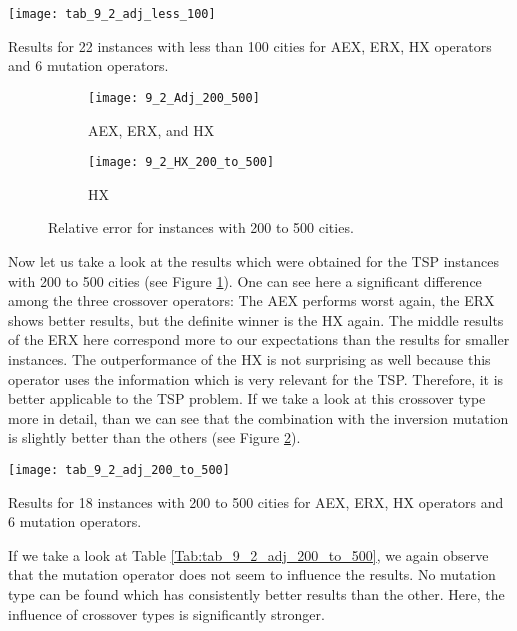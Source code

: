  \begin{table}[htp] \centering
	\centering
	\texttt{[image: tab\_9\_2\_adj\_less\_100]}
	\caption{Results for 22 instances with less than 100 cities for AEX, ERX, HX operators and 6 mutation operators.}
	\label{Tab:tab_9_2_adj_less_100}
\end{table}


\begin{figure}[htp] \centering
	\begin{subfigure}[t]{0.45\textwidth}
		\texttt{[image: 9\_2\_Adj\_200\_500]}
		\caption{AEX, ERX, and HX}
		\label{fig:9_2_Adj_200_500}
	\end{subfigure}
	\hfill
	\begin{subfigure}[t]{0.45\textwidth}
		\centering
		\texttt{[image: 9\_2\_HX\_200\_to\_500]}
		\caption{HX}
		\label{fig:9_2_HX_200_to_500}
	\end{subfigure}	
	\caption{Relative error for instances with 200 to 500 cities.}
	\label{fig:9_2_200_to_500}
\end{figure}

Now let us take a look at the results which were obtained for the TSP instances with 200 to 500 cities  (see Figure \ref{fig:9_2_Adj_200_500}). One can see here a significant difference among the three crossover operators: The AEX performs worst again, the ERX shows better results, but the definite winner is the HX again. The middle results of the ERX here correspond more to our expectations than the results for smaller instances. The outperformance of the HX is not surprising as well because this operator uses the information which is very relevant for the TSP.  Therefore, it is better applicable to the TSP problem. If we take a look at this crossover type more in detail, than we can see that the combination with the inversion mutation is slightly better than the others (see Figure \ref{fig:9_2_HX_200_to_500}).\par  

 \begin{table}[htp] \centering
	\centering
	\texttt{[image: tab\_9\_2\_adj\_200\_to\_500]}
	\caption{Results for 18 instances with 200 to 500 cities for AEX, ERX, HX operators and 6 mutation operators.}
	\label{Tab:tab_9_2_adj_200_to_500}
\end{table}

If we take a look at Table \ref{Tab:tab_9_2_adj_200_to_500}, we again observe that the mutation operator does not seem to influence the results. No mutation type can be found which has consistently better results than the other. Here, the influence of crossover types is significantly stronger.\par 

